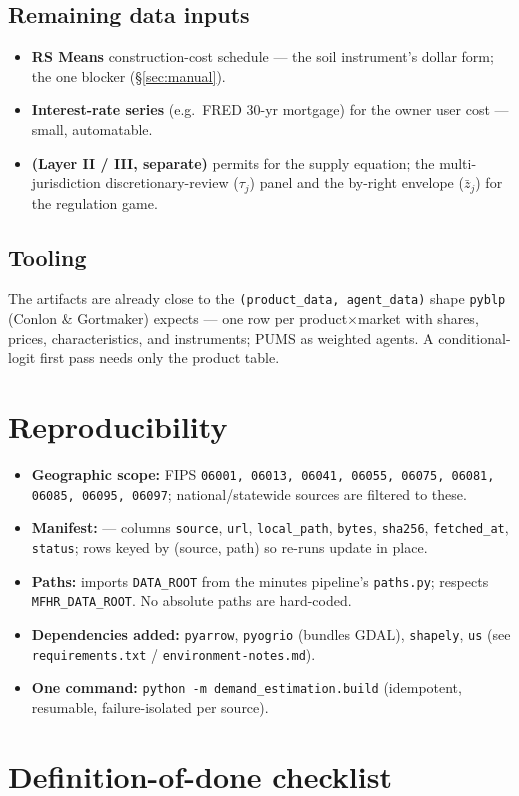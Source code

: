 \documentclass[11pt]{article}
\begin{document}
\subsection{Remaining data inputs}
\begin{itemize}[leftmargin=1.5em, itemsep=1pt]
\item \textbf{RS Means} construction-cost schedule --- the soil instrument's dollar form; the one
  blocker (\S\ref{sec:manual}).
\item \textbf{Interest-rate series} (e.g.\ FRED 30-yr mortgage) for the owner user cost --- small,
  automatable.
\item \textbf{(Layer II / III, separate)} permits for the supply equation; the multi-jurisdiction
  discretionary-review ($\tau_j$) panel and the by-right envelope ($\bar z_j$) for the regulation game.
\end{itemize}

\subsection{Tooling}
The artifacts are already close to the \texttt{(product\_data, agent\_data)} shape \texttt{pyblp}
(Conlon \& Gortmaker) expects --- one row per product$\times$market with shares, prices,
characteristics, and instruments; PUMS as weighted agents. A conditional-logit first pass needs
only the product table.

\section{Reproducibility}
\begin{itemize}[leftmargin=1.5em]
\item \textbf{Geographic scope:} FIPS \texttt{06001, 06013, 06041, 06055, 06075,
  06081, 06085, 06095, 06097}; national/statewide sources are filtered to these.
\item \textbf{Manifest:}  --- columns
  \texttt{source}, \texttt{url}, \texttt{local\_path}, \texttt{bytes},
  \texttt{sha256}, \texttt{fetched\_at}, \texttt{status}; rows keyed by
  (source, path) so re-runs update in place.
\item \textbf{Paths:}  imports
  \texttt{DATA\_ROOT} from the minutes pipeline's \texttt{paths.py}; respects
  \texttt{MFHR\_DATA\_ROOT}. No absolute paths are hard-coded.
\item \textbf{Dependencies added:} \texttt{pyarrow}, \texttt{pyogrio} (bundles
  GDAL), \texttt{shapely}, \texttt{us} (see \texttt{requirements.txt} /
  \texttt{environment-notes.md}).
\item \textbf{One command:} \texttt{python -m demand\_estimation.build}
  (idempotent, resumable, failure-isolated per source).
\end{itemize}

\section{Definition-of-done checklist}

\end{document}
